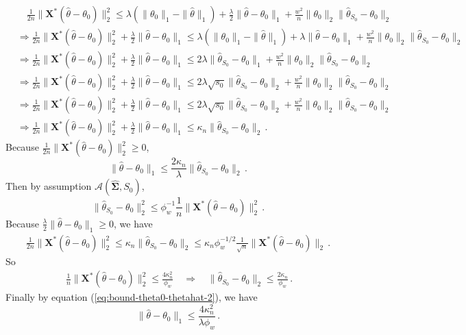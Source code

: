 \documentclass[11pt]{article}
\renewcommand{\hat}{\widehat}
\newcommand{\bX}{\boldsymbol{X}}
\newcommand{\bSigma}{\boldsymbol{\Sigma}}
\begin{document}
    \begin{align*}
        &\quad\frac{1}{2n}\|\bX^*(\hat{\theta}-\theta_0)\|_2^2\leq \lambda(\|\theta_0\|_1-\|\hat{\theta}\|_1) + \frac{\lambda}{2}\|\hat{\theta}-\theta_0\|_1+\frac{w^2}{n}\|\theta_0\|_2\|\hat{\theta}_{S_0}-\theta_0\|_2\\
        &\Rightarrow  \frac{1}{2n}\|\bX^*(\hat{\theta}-\theta_0)\|_2^2+\frac{\lambda}{2}\|\hat{\theta}-\theta_0\|_1 \leq \lambda(\|\theta_0\|_1-\|\hat{\theta}\|_1) + \lambda\|\hat{\theta}-\theta_0\|_1+\frac{w^2}{n}\|\theta_0\|_2\|\hat{\theta}_{S_0}-\theta_0\|_2\\
        &\Rightarrow  \frac{1}{2n}\|\bX^*(\hat{\theta}-\theta_0)\|_2^2+\frac{\lambda}{2}\|\hat{\theta}-\theta_0\|_1 \leq  2\lambda\|\hat{\theta}_{S_0}-\theta_0\|_1+\frac{w^2}{n}\|\theta_0\|_2\|\hat{\theta}_{S_0}-\theta_0\|_2\\
        &\Rightarrow  \frac{1}{2n}\|\bX^*(\hat{\theta}-\theta_0)\|_2^2+\frac{\lambda}{2}\|\hat{\theta}-\theta_0\|_1 \leq  2\lambda\sqrt{s_0}\|\hat{\theta}_{S_0}-\theta_0\|_2+\frac{w^2}{n}\|\theta_0\|_2\|\hat{\theta}_{S_0}-\theta_0\|_2\\
        &\Rightarrow  \frac{1}{2n}\|\bX^*(\hat{\theta}-\theta_0)\|_2^2+\frac{\lambda}{2}\|\hat{\theta}-\theta_0\|_1 \leq  2\lambda\sqrt{s_0}\|\hat{\theta}_{S_0}-\theta_0\|_2+\frac{w^2}{n}\|\theta_0\|_2\|\hat{\theta}_{S_0}-\theta_0\|_2\\
        &\Rightarrow  \frac{1}{2n}\|\bX^*(\hat{\theta}-\theta_0)\|_2^2+\frac{\lambda}{2}\|\hat{\theta}-\theta_0\|_1 \leq  \kappa_n\|\hat{\theta}_{S_0}-\theta_0\|_2\,.
    \end{align*}
    Because $\frac{1}{2n}\|\bX^*(\hat{\theta}-\theta_0)\|_2^2\geq 0 $,
    \begin{equation}\label{eq:bound-theta0-thetahat-2}
        \|\hat{\theta}-\theta_0\|_1\leq \frac{2\kappa_n}{\lambda}\|\hat{\theta}_{S_0}-\theta_0\|_2\,.
    \end{equation}
    Then by assumption $\mathcal{A}(\hat{\bSigma},S_0)$, 
    \begin{equation*}
        \|\hat{\theta}_{S_0}-\theta_0\|_2^2\leq \phi_w^{-1}\frac{1}{n}\|\bX^*(\hat{\theta}-\theta_0)\|_2^2\,.
    \end{equation*}
    Because $\frac{\lambda}{2}\|\hat{\theta}-\theta_0\|_1\geq 0$, we have
    \begin{align*}
        \frac{1}{2n}\|\bX^*(\hat{\theta}-\theta_0)\|_2^2\leq  \kappa_n\|\hat{\theta}_{S_0}-\theta_0\|_2
        \leq  \kappa_n\phi_w^{-1/2}\frac{1}{\sqrt{n}}\|\bX^*(\hat{\theta}-\theta_0)\|_2\,.
    \end{align*}
    So
    \begin{align*}
        \ \frac{1}{n}\|\bX^*(\hat{\theta}-\theta_0)\|_2^2\leq  \frac{4\kappa_n^2}{\phi_w}
        \quad \Rightarrow \quad \|\hat{\theta}_{S_0}-\theta_0\|_2\leq \frac{2\kappa_n}{\phi_w}\,.
    \end{align*}
    Finally by equation (\ref{eq:bound-theta0-thetahat-2}), we have
    \begin{equation*}
        \|\hat{\theta}-\theta_0\|_1\leq \frac{4\kappa_n^2}{\lambda\phi_w}\,.
    \end{equation*}
\end{document}
